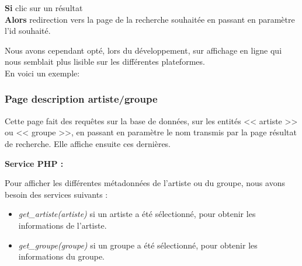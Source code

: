             \begin{paragraphe}
                \textbf{Si} clic sur un résultat\\
                \textbf{Alors} redirection vers la page de la recherche souhaitée en passant en paramètre l'id souhaité.
            \end{paragraphe}

            \begin{paragraphe}
                Nous avons cependant opté, lors du développement, sur affichage en ligne qui nous semblait plus lisible sur les différentes plateformes.\\
                En voici un exemple:
            \end{paragraphe}
            

        \clearpage

		\subsubsection{Page description artiste/groupe}
            \begin{paragraphe}
                Cette page fait des requêtes sur la base de données, sur les entités << artiste >> ou << groupe >>,
                 en passant en paramètre le nom transmis par la page résultat de recherche. Elle affiche ensuite ces dernières.
            \end{paragraphe}

            \begin{paragraphe}
                \textbf{Service PHP :}
            \end{paragraphe}

            \begin{paragraphe}
                Pour afficher les différentes métadonnées de l'artiste ou du groupe, nous avons besoin des services suivants :
                \begin{itemize}
                        \item \emph{get\_artiste(artiste)} si un artiste a été sélectionné, pour obtenir les informations de l'artiste.
                        \item \emph{get\_groupe(groupe)} si un groupe a été sélectionné, pour obtenir les informations du groupe.
                \end{itemize}
            \end{paragraphe}

